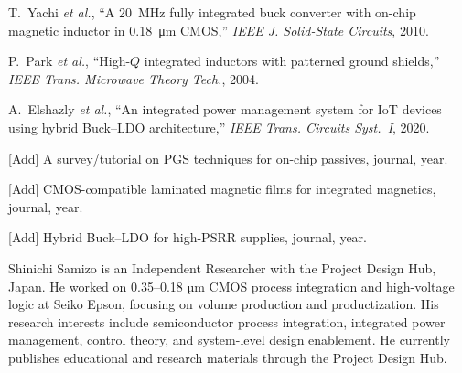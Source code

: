 \documentclass[journal]{IEEEtran}
\begin{document}
\begin{thebibliography}{00}

T.~Yachi \emph{et al.}, ``A \SI{20}{\mega\hertz} fully integrated buck converter with on-chip magnetic inductor in \SI{0.18}{\um} CMOS,'' \emph{IEEE J. Solid-State Circuits}, 2010.

P.~Park \emph{et al.}, ``High-$Q$ integrated inductors with patterned ground shields,'' \emph{IEEE Trans. Microwave Theory Tech.}, 2004.

A.~Elshazly \emph{et al.}, ``An integrated power management system for IoT devices using hybrid Buck--LDO architecture,'' \emph{IEEE Trans. Circuits Syst.~I}, 2020.

{\small [Add] A survey/tutorial on PGS techniques for on-chip passives, journal, year.}

{\small [Add] CMOS-compatible laminated magnetic films for integrated magnetics, journal, year.}

{\small [Add] Hybrid Buck--LDO for high-PSRR supplies, journal, year.}

\end{thebibliography}

\begin{IEEEbiographynophoto}{Shinichi Samizo}
is an Independent Researcher with the Project Design Hub, Japan. 
He worked on 0.35–0.18 µm CMOS process integration and high-voltage logic at Seiko Epson, focusing on volume production and productization. 
His research interests include semiconductor process integration, integrated power management, control theory, and system-level design enablement. 
He currently publishes educational and research materials through the Project Design Hub.
\end{IEEEbiographynophoto}
\end{document}

